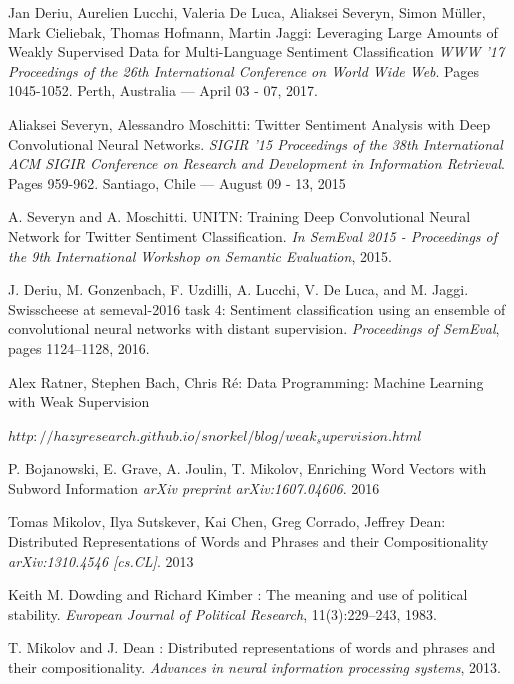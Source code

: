 \documentclass[12pt,a4paper]{article}
\begin{document}
\begin{thebibliography}{9}
Jan Deriu, Aurelien Lucchi, Valeria De Luca, Aliaksei Severyn, Simon Müller, Mark Cieliebak, Thomas Hofmann, Martin Jaggi: Leveraging Large Amounts of Weakly Supervised Data for Multi-Language Sentiment Classification 
\textit{ WWW '17 Proceedings of the 26th International Conference on World Wide Web}. 
Pages 1045-1052. Perth, Australia — April 03 - 07, 2017.

Aliaksei Severyn, Alessandro Moschitti: Twitter Sentiment Analysis with Deep Convolutional Neural Networks.
\textit{ SIGIR '15 Proceedings of the 38th International ACM SIGIR Conference on Research and Development in Information Retrieval}. Pages 959-962. Santiago, Chile — August 09 - 13, 2015 

A. Severyn and A. Moschitti. UNITN: Training Deep Convolutional Neural Network for Twitter Sentiment Classification. 
\textit{ In SemEval 2015 - Proceedings of the 9th International Workshop on Semantic Evaluation}, 2015.

J. Deriu, M. Gonzenbach, F. Uzdilli, A. Lucchi, V. De Luca, and M. Jaggi. Swisscheese at semeval-2016 task 4: Sentiment classification using an ensemble of convolutional neural networks with distant supervision. 
\textit{ Proceedings of SemEval}, pages 1124–1128, 2016.

Alex Ratner, Stephen Bach, Chris Ré: Data Programming: Machine Learning with Weak Supervision

\textit{$http://hazyresearch.github.io/snorkel/blog/weak_supervision.html$}

P. Bojanowski, E. Grave, A. Joulin, T. Mikolov, Enriching Word Vectors with Subword Information
\textit{arXiv preprint arXiv:1607.04606}. 2016

Tomas Mikolov, Ilya Sutskever, Kai Chen, Greg Corrado, Jeffrey Dean: Distributed Representations of Words and Phrases and their Compositionality
\textit{arXiv:1310.4546 [cs.CL]}. 2013

Keith M. Dowding and Richard Kimber : The meaning and use of political stability.
\textit{European Journal of Political Research}, 11(3):229–243, 1983.

T. Mikolov and J. Dean : Distributed representations of words and phrases and their compositionality. 
\textit{Advances in neural information processing systems}, 
2013.


\end{thebibliography}
\end{document}
